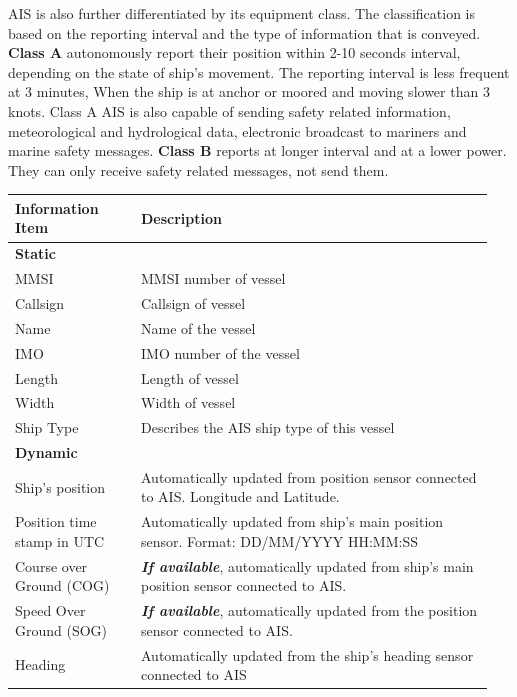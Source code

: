 AIS is also further differentiated by its equipment class. The classification is based on the reporting interval and the type of information that is conveyed. \textbf{Class A} autonomously report their position within 2-10 seconds interval, depending on the state of ship's movement. The reporting interval is less frequent at 3 minutes, When the ship is at anchor or moored and moving slower than 3 knots. Class A AIS is also capable of sending safety related information, meteorological and hydrological data, electronic broadcast to mariners and marine safety messages. \textbf{Class B} reports at longer interval and at a lower power. They can only receive safety related messages, not send them. \\

\begin{table}
    \footnotesize
    \centering
    {\begin{tabular}{ p{0.25\linewidth} p{0.7\linewidth}  }
    \hline
    \textbf{Information Item} & \textbf{Description} \\
    \hline
    \multicolumn{2}{l}{\textbf{Static}}\\
    \hline
    MMSI & MMSI number of vessel\\
    Callsign & Callsign of vessel \\
    Name & Name of the vessel \\
    IMO & IMO number of the vessel \\
    Length & Length of vessel \\
    Width & Width of vessel \\
    Ship Type & Describes the AIS ship type of this vessel \\
    \hline
    \multicolumn{2}{l}{\textbf{Dynamic}}\\
    \hline
    Ship's position & Automatically updated from position sensor connected to AIS. Longitude and Latitude.\\
    Position time stamp in UTC & Automatically updated from ship's main position sensor. Format: DD\slash MM\slash YYYY HH:MM:SS\\
    Course over Ground (COG) & \emph{\textbf{If available}}, automatically updated from ship's main position sensor connected to AIS.\\  
    Speed Over Ground (SOG) & \emph{\textbf{If available}}, automatically updated from the position sensor connected to AIS.\\
    Heading & Automatically updated from the ship's heading sensor connected to AIS\\

\end{tabular}}
\end{table}
